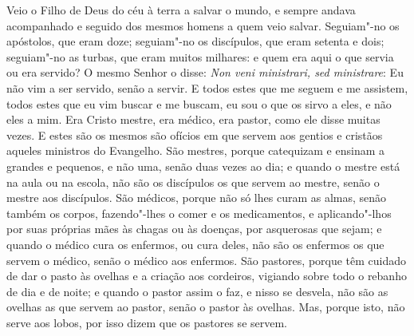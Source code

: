 Veio o Filho de Deus do céu à terra a salvar o mundo, e sempre andava
acompanhado e seguido dos mesmos homens a quem veio salvar. Seguiam"-no
os apóstolos, que eram doze; seguiam"-no os discípulos, que eram setenta
e dois; seguiam"-no as turbas, que eram muitos milhares: e quem era aqui
o que servia ou era servido? O mesmo Senhor o disse: \emph{Non veni
ministrari, sed ministrare}: Eu não vim a ser servido, %
senão a servir. E todos estes que me seguem e me assistem, todos
estes que eu vim buscar e me buscam, eu sou o que os sirvo a eles, e não
eles a mim. Era Cristo mestre, era médico, era pastor, como ele disse
muitas vezes. E estes são os mesmos são ofícios em que servem aos
gentios e cristãos aqueles ministros do Evangelho. São mestres, porque
catequizam e ensinam a grandes e pequenos, e não uma, senão duas vezes
ao dia; e quando o mestre está na aula ou na escola, não são os
discípulos os que servem ao mestre, senão o mestre aos discípulos. São
médicos, porque não só lhes curam as almas, senão também os corpos,
fazendo"-lhes o comer e os medicamentos, e aplicando"-lhos por suas
próprias mães às chagas ou às doenças, por asquerosas que sejam; e
quando o médico cura os enfermos, ou cura deles, não são os enfermos os
que servem o médico, senão o médico aos enfermos. São pastores, porque
têm cuidado de dar o pasto às ovelhas e a criação aos cordeiros,
vigiando sobre todo o rebanho de dia e de noite; e quando o pastor assim
o faz, e nisso se desvela, não são as ovelhas as que servem ao pastor,
senão o pastor às ovelhas. Mas, porque isto, não serve aos lobos, por
isso dizem que os pastores se servem.

